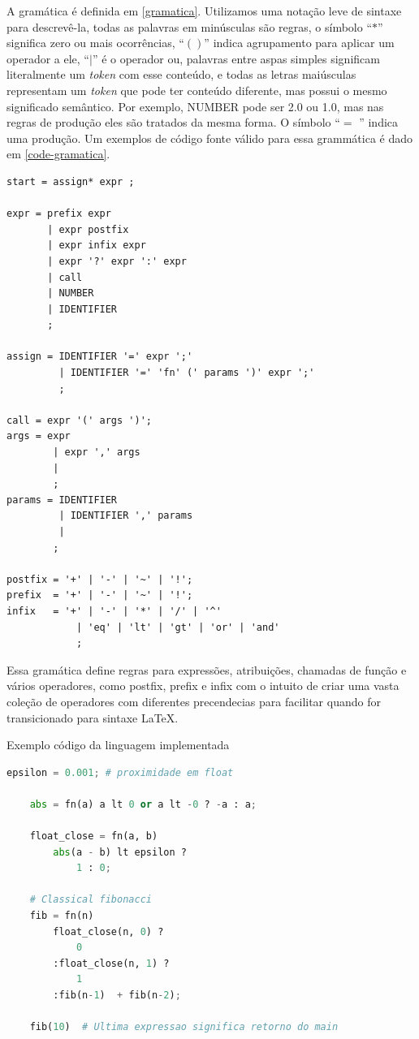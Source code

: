 \documentclass[english, 
               brazil, 
               bsc] %
               {dcomp-abntex2}
\begin{document}
A gramática é definida em \autoref{gramatica}. Utilizamos uma notação leve de sintaxe para descrevê-la, todas as palavras em minúsculas são regras, o símbolo ``$*$'' significa zero ou mais ocorrências, ``$()$'' indica agrupamento para aplicar um operador a ele, ``$|$'' é o operador ou, palavras entre aspas simples significam literalmente um \textit{token} com esse conteúdo, e todas as letras maiúsculas representam um \textit{token} que pode ter conteúdo diferente, mas possui o mesmo significado semântico. Por exemplo, NUMBER pode ser 2.0 ou 1.0, mas nas regras de produção eles são tratados da mesma forma. O símbolo ``$=$ '' indica uma produção. Um exemplos de código fonte válido para essa grammática é dado em \autoref{code-gramatica}.
\label{gramatica}
\begin{verbatim}
start = assign* expr ;

expr = prefix expr 
       | expr postfix  
       | expr infix expr 
       | expr '?' expr ':' expr
       | call
       | NUMBER
       | IDENTIFIER
       ;

assign = IDENTIFIER '=' expr ';'
         | IDENTIFIER '=' 'fn' (' params ')' expr ';'
         ; 

call = expr '(' args ')';
args = expr
        | expr ',' args
        | 
        ;
params = IDENTIFIER
         | IDENTIFIER ',' params
         | 
        ;

postfix = '+' | '-' | '~' | '!';
prefix  = '+' | '-' | '~' | '!';
infix   = '+' | '-' | '*' | '/' | '^'
            | 'eq' | 'lt' | 'gt' | 'or' | 'and'
            ;

\end{verbatim}

Essa gramática define regras para expressões, atribuições, chamadas de função e vários operadores, como postfix, prefix e infix com o intuito de criar uma vasta coleção de operadores com diferentes precendecias para facilitar quando for transicionado para sintaxe \LaTeX .


\begin{algoritmo}[H]
	\caption{Exemplo código da linguagem implementada}
	\label{code-gramatica}
  \begin{lstlisting}[language = python]
    epsilon = 0.001; # proximidade em float

    abs = fn(a) a lt 0 or a lt -0 ? -a : a;

    float_close = fn(a, b) 
        abs(a - b) lt epsilon ? 
            1 : 0;

    # Classical fibonacci
    fib = fn(n)  
        float_close(n, 0) ? 
            0
        :float_close(n, 1) ?
            1
        :fib(n-1)  + fib(n-2);

    fib(10)  # Ultima expressao significa retorno do main
  \end{lstlisting}
\end{algoritmo}
\end{document}
